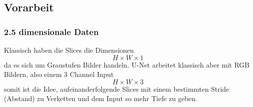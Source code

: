 \begin{table}[]
 \begin{center}
   \caption{Metadaten für drei slices}\label{tabelle_meta_daten}
 \end{center}
\end{table}

\pagebreak

\subsection{Vorarbeit}

\subsubsection{2.5 dimensionale Daten}

Klassisch haben die Slices die Dimensionen 
\begin{equation}
H \times W \times 1
\end{equation}
da es sich um Graustufen Bilder handeln. U-Net arbeitet klassisch aber mit RGB Bildern, also einem 3 Channel Input
\begin{equation}
H \times W \times 3
\end{equation}
somit ist die Idee, aufeinanderfolgende Slices mit einem bestimmten Stride (Abstand) zu Verketten und dem Input so mehr Tiefe zu geben.

